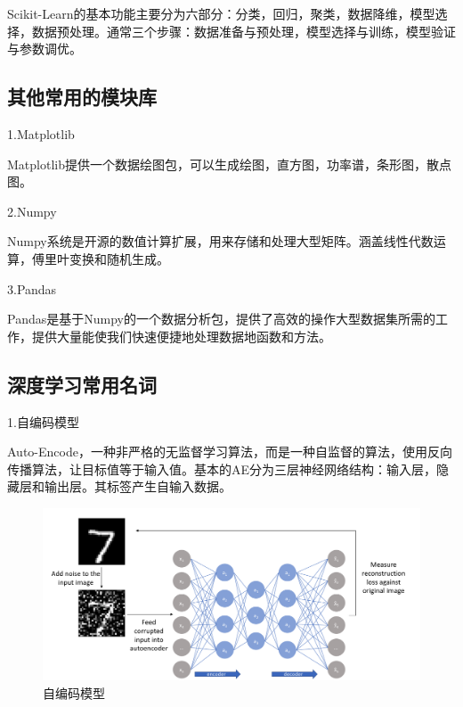 \documentclass[openbib]{article}
\begin{document}
	Scikit-Learn的基本功能主要分为六部分：分类，回归，聚类，数据降维，模型选择，数据预处理。通常三个步骤：数据准备与预处理，模型选择与训练，模型验证与参数调优。
	
	\subsection{其他常用的模块库}
	\begin{center}
		1.Matplotlib
	\end{center}

	Matplotlib提供一个数据绘图包，可以生成绘图，直方图，功率谱，条形图，散点图。
	
	\begin{center}
		2.Numpy
	\end{center}

	Numpy系统是开源的数值计算扩展，用来存储和处理大型矩阵。涵盖线性代数运算，傅里叶变换和随机生成。
	
	\begin{center}
		3.Pandas
	\end{center}

	Pandas是基于Numpy的一个数据分析包，提供了高效的操作大型数据集所需的工作，提供大量能使我们快速便捷地处理数据地函数和方法。
	
	\subsection{深度学习常用名词}

	
	\begin{center}
		1.自编码模型
	\end{center}

	Auto-Encode，一种非严格的无监督学习算法，而是一种自监督的算法，使用反向传播算法，让目标值等于输入值。基本的AE分为三层神经网络结构：输入层，隐藏层和输出层。其标签产生自输入数据。
	
		\begin{figure}[htbp]
		\centering
		\includegraphics[scale=0.3]{自编码模型.jpg}
		\caption{自编码模型}
		\end{figure}
		
\end{document}
